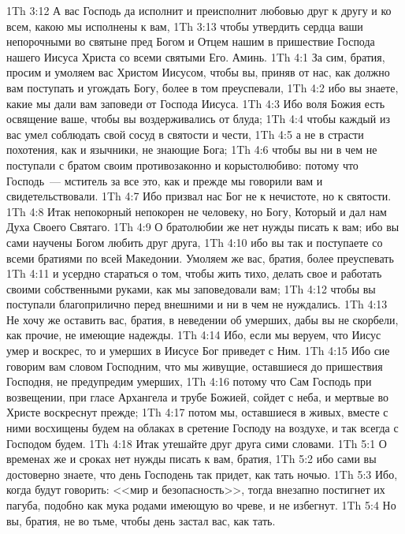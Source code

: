 \vs 1Th 3:12 А вас Господь да исполнит и преисполнит любовью друг к другу и ко всем, какою мы исполнены к вам,
\vs 1Th 3:13 чтобы утвердить сердца ваши непорочными во святыне пред Богом и Отцем нашим в пришествие Господа нашего Иисуса Христа со всеми святыми Его. Аминь.
\vs 1Th 4:1 За сим, братия, просим и умоляем вас Христом Иисусом, чтобы вы, приняв от нас, как должно вам поступать и угождать Богу, более в том преуспевали,
\vs 1Th 4:2 ибо вы знаете, какие мы дали вам заповеди от Господа Иисуса.
\vs 1Th 4:3 Ибо воля Божия есть освящение ваше, чтобы вы воздерживались от блуда;
\vs 1Th 4:4 чтобы каждый из вас умел соблюдать свой сосуд в святости и чести,
\vs 1Th 4:5 а не в страсти похотения, как и язычники, не знающие Бога;
\vs 1Th 4:6 чтобы вы ни в чем не поступали с братом своим противозаконно и корыстолюбиво: потому что Господь~--- мститель за все это, как и прежде мы говорили вам и свидетельствовали.
\vs 1Th 4:7 Ибо призвал нас Бог не к нечистоте, но к святости.
\vs 1Th 4:8 Итак непокорный непокорен не человеку, но Богу, Который и дал нам Духа Своего Святаго.
\rsbpar\vs 1Th 4:9 О братолюбии же нет нужды писать к вам; ибо вы сами научены Богом любить друг друга,
\vs 1Th 4:10 ибо вы так и поступаете со всеми братиями по всей Македонии. Умоляем же вас, братия, более преуспевать
\vs 1Th 4:11 и усердно стараться о том, чтобы жить тихо, делать свое  и работать своими собственными руками, как мы заповедовали вам;
\vs 1Th 4:12 чтобы вы поступали благоприлично перед внешними и ни в чем не нуждались.
\rsbpar\vs 1Th 4:13 Не хочу же оставить вас, братия, в неведении об умерших, дабы вы не скорбели, как прочие, не имеющие надежды.
\vs 1Th 4:14 Ибо, если мы веруем, что Иисус умер и воскрес, то и умерших в Иисусе Бог приведет с Ним.
\vs 1Th 4:15 Ибо сие говорим вам словом Господним, что мы живущие, оставшиеся до пришествия Господня, не предупредим умерших,
\vs 1Th 4:16 потому что Сам Господь при возвещении, при гласе Архангела и трубе Божией, сойдет с неба, и мертвые во Христе воскреснут прежде;
\vs 1Th 4:17 потом мы, оставшиеся в живых, вместе с ними восхищены будем на облаках в сретение Господу на воздухе, и так всегда с Господом будем.
\vs 1Th 4:18 Итак утешайте друг друга сими словами.
\vs 1Th 5:1 О временах же и сроках нет нужды писать к вам, братия,
\vs 1Th 5:2 ибо сами вы достоверно знаете, что день Господень так придет, как тать ночью.
\vs 1Th 5:3 Ибо, когда будут говорить: <<мир и безопасность>>, тогда внезапно постигнет их пагуба, подобно как мука родами  имеющую во чреве, и не избегнут.
\vs 1Th 5:4 Но вы, братия, не во тьме, чтобы день застал вас, как тать.
